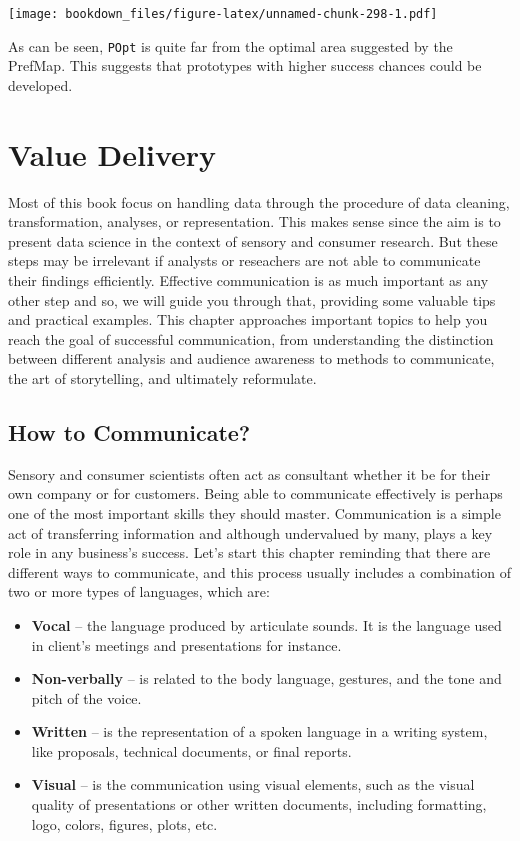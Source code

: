 \documentclass[
]{krantz}
\providecommand{\tightlist}{%
  \setlength{\itemsep}{0pt}\setlength{\parskip}{0pt}}
\renewenvironment{quote}{\begin{VF}}{\end{VF}}
\begin{document}
\texttt{[image: bookdown\_files/figure-latex/unnamed-chunk-298-1.pdf]}

As can be seen, \texttt{POpt} is quite far from the optimal area suggested by the PrefMap. This suggests that prototypes with higher success chances could be developed.

\hypertarget{value-delivery}{%
\chapter{Value Delivery}\label{value-delivery}}

\begin{quote}
Most of this book focus on handling data through the procedure of data cleaning, transformation, analyses, or representation. This makes sense since the aim is to present data science in the context of sensory and consumer research. But these steps may be irrelevant if analysts or reseachers are not able to communicate their findings efficiently. Effective communication is as much important as any other step and so, we will guide you through that, providing some valuable tips and practical examples. This chapter approaches important topics to help you reach the goal of successful communication, from understanding the distinction between different analysis and audience awareness to methods to communicate, the art of storytelling, and ultimately reformulate.
\end{quote}

\hypertarget{how-to-communicate}{%
\section{How to Communicate?}\label{how-to-communicate}}

Sensory and consumer scientists often act as consultant whether it be for their own company or for customers. Being able to communicate effectively is perhaps one of the most important skills they should master. Communication is a simple act of transferring information and although undervalued by many, plays a key role in any business's success. Let's start this chapter reminding that there are different ways to communicate, and this process usually includes a combination of two or more types of languages, which are:

\begin{itemize}
\tightlist
\item
  \textbf{Vocal} -- the language produced by articulate sounds. It is the language used in client's meetings and presentations for instance.
\item
  \textbf{Non-verbally} -- is related to the body language, gestures, and the tone and pitch of the voice.
\item
  \textbf{Written} -- is the representation of a spoken language in a writing system, like proposals, technical documents, or final reports.
\item
  \textbf{Visual} -- is the communication using visual elements, such as the visual quality of presentations or other written documents, including formatting, logo, colors, figures, plots, etc.
\end{itemize}
\end{document}
